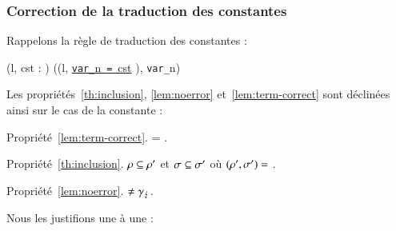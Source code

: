 \subsubsection*{Correction de la traduction des constantes}


Rappelons la règle de traduction des constantes :

{
  {}
  { (l, cst : ) \trule
    ((l, \Zinit\underline{\mbox{\lstinline'var_'}n~\mbox{\lstinline'='}~cst}
    \semicolon),
    \mbox{\lstinline'var_'}n) }{}
}

Les propriétés~\ref{th:inclusion}, \ref{lem:noerror} et~\ref{lem:term-correct}
sont déclinées ainsi sur le cas de la constante :

Propriété~\ref{lem:term-correct}.  =
.


Propriété~\ref{th:inclusion}.
$\rho \subseteq \rho'$ et $\sigma \subseteq \sigma'$ où
 $(\rho', \sigma') =$
.


Propriété~\ref{lem:noerror}.
$\neq \gamma_\lightning$.

Nous les justifions une à une :

